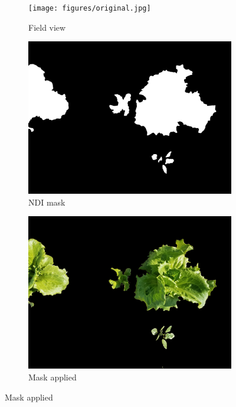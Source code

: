 \documentclass[12pt]{article}
\begin{document}
\begin{figure}[H]
	\centering
	\begin{subfigure}[h]{.20\textwidth}
	  \centering
	  \texttt{[image: figures/original.jpg]}
	  \caption{Field view}
	  \label{fig:original}
	\end{subfigure}
	\begin{subfigure}[h]{.20\textwidth}
	  \centering
	  \includegraphics[width=1\linewidth]{figures/original-mask.jpg}
	  \caption{NDI mask}
	  \label{fig:mask}
	\end{subfigure}
	\begin{subfigure}[h]{.20\textwidth}
	  \centering
	  \includegraphics[width=1\linewidth]{figures/original-masked.jpg}
	  \caption{Mask applied}

\end{subfigure}
\end{figure}
\end{document}
